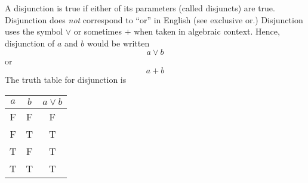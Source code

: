 \documentclass{article}
\begin{document}
A disjunction is true if either of its parameters (called disjuncts) are true.  Disjunction does \emph{not} correspond to ``or'' in English (see exclusive or.)  Disjunction uses the symbol $\lor$ or sometimes $+$ when taken in algebraic context.  Hence, disjunction of $a$ and $b$ would be written $$ a \lor b $$ or $$ a + b $$  The truth table for  disjunction is 

\begin{center}
\begin{tabular}{ccc}
$a$ & $b$ & $a \lor b$ \\
\hline
F & F & F \\
F & T & T \\
T & F & T \\
T & T & T
\end{tabular}
\end{center}
\end{document}
